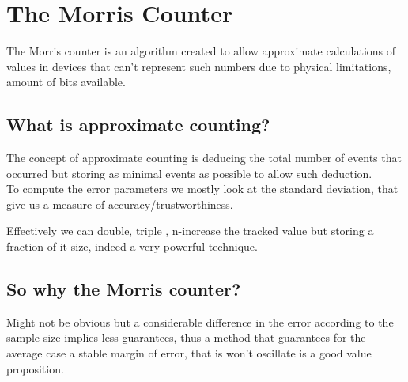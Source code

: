 \section{The Morris Counter}

The Morris counter is an algorithm created to allow approximate calculations of values in devices that can't represent
such numbers due to physical limitations, amount of bits available.

\subsection{What is approximate counting?}

The concept of approximate counting is deducing the total number of events that occurred but storing as minimal events as possible
to allow such deduction.
\\
To compute the error parameters we mostly look at the standard deviation, that give us a measure of accuracy/trustworthiness.

Effectively we can double, triple , n-increase the tracked value but storing a fraction of it size, indeed a very powerful technique.

\subsection{So why the Morris counter?}

Might not be obvious but a considerable difference in the error according to the sample size implies less guarantees, thus a method
that guarantees for the average case a stable margin of error, that is won't oscillate is a good value proposition.

